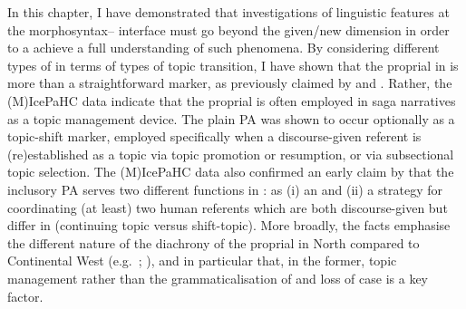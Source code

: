 \documentclass[output=paper,colorlinks,citecolor=brown]{langscibook}
\begin{document}
\begin{sloppypar}
In this chapter, I have demonstrated that investigations of linguistic features at the morphosyntax-- interface must go beyond the given/new dimension in order to a achieve a full understanding of such phenomena. By considering different types of  in terms of types of topic transition,
I have shown that the proprial  in  is more than a straightforward  marker, as previously claimed by \citet{Sigurdsson2006} and \citet{Johnsen2016}.
Rather, the (M)IcePaHC  data indicate that the proprial  is often employed in  saga narratives as a topic management device. 
The plain PA was shown to occur optionally as a topic-shift marker, employed specifically when a discourse-given referent is (re)established as a topic via topic promotion or resumption, or via subsectional topic selection. The (M)IcePaHC data also confirmed an early claim by \citet{heusler1962altislandisches} that the inclusory PA serves two different functions in : as (i) an  and (ii) a strategy for coordinating (at least) two human referents which are both discourse-given but differ in  (continuing topic versus shift-topic). 
More broadly, the  facts emphasise the different nature of the diachrony of the proprial  in North  compared to Continental West  (e.g.~\citealp{Schmuck2014}; \citealp{Schmuck2020-hex,schmuck2020grammaticalisation,schmuck2020rise}), and in particular that, in the former, topic management rather than the grammaticalisation of  and loss of case is a key factor.
\end{sloppypar}

 
\end{document}
